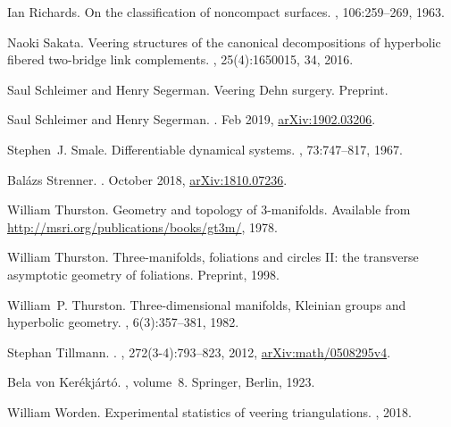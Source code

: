 \documentclass[12pt]{amsart}
\begin{document}
\begin{thebibliography}{10}
Ian Richards.
\newblock On the classification of noncompact surfaces.
, 106:259--269, 1963.

Naoki Sakata.
\newblock Veering structures of the canonical decompositions of hyperbolic
  fibered two-bridge link complements.
, 25(4):1650015, 34, 2016.

Saul Schleimer and Henry Segerman.
\newblock Veering {D}ehn surgery.
\newblock Preprint.

Saul {Schleimer} and Henry {Segerman}.
.
\newblock Feb 2019,
  \href{http://arxiv.org/abs/1902.03206}{{arXiv:1902.03206}}.

Stephen~J. Smale.
\newblock Differentiable dynamical systems.
, 73:747--817, 1967.

Bal{\'a}zs {Strenner}.
.
\newblock October 2018,
  \href{http://arxiv.org/abs/1810.07236}{{arXiv:1810.07236}}.

William Thurston.
\newblock Geometry and topology of 3-manifolds.
\newblock Available from \url{http://msri.org/publications/books/gt3m/}, 1978.

William Thurston.
\newblock Three-manifolds, foliations and circles {II}: the transverse
  asymptotic geometry of foliations.
\newblock Preprint, 1998.

William~P. Thurston.
\newblock Three-dimensional manifolds, {K}leinian groups and hyperbolic
  geometry.
, 6(3):357--381, 1982.

Stephan Tillmann.
.
, 272(3-4):793--823, 2012,
  \href{http://arxiv.org/abs/math/0508295v4}{{arXiv:math/0508295v4}}.

Bela {von Ker\'ekj\'art\'o}.
, volume~8.
\newblock Springer, Berlin, 1923.

William Worden.
\newblock Experimental statistics of veering triangulations.
, 2018.

\end{thebibliography}
 
\end{document}
